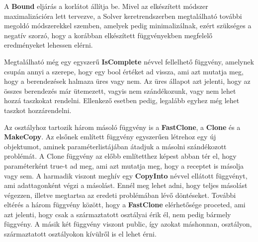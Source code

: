 A \textbf{Bound} eljárás a korlátot állítja be.
Mivel az elkészített módszer maximalizációra lett tervezve, a Solver keretrendszerben megtalálható további megoldó módszerekkel szemben, amelyek pedig minimalizálnak, ezért szükséges a negatív szorzó, hogy a korábban elkészített függvényekben megfelelő eredményeket lehessen elérni.

Megtalálható még egy egyszerű \textbf{IsComplete} névvel fellelhető függvény, amelynek csupán annyi a szerepe, hogy egy bool értéket ad vissza, ami azt mutatja meg, hogy a berendezések halmaza üres vagy nem.
Az üres állapot azt jelenti, hogy az összes berendezés már ütemezett, vagyis nem szándékozunk, vagy nem lehet hozzá taszkokat rendelni. Ellenkező esetben pedig, legalább egyhez még lehet taszkot hozzárendelni.

Az osztályhoz tartozik három másoló függvény is a \textbf{FastClone}, a \textbf{Clone} és a \textbf{MakeCopy}.
Az elsőnek említett függvény egyszerűen létrehoz egy új objektumot, aminek paraméterlistájában átadjuk a másolni szándékozott problémát.
A Clone függvény az előbb említetthez képest abban tér el, hogy paraméterként true-t ad meg, ami azt mutatja meg, hogy a receptet is másolja vagy sem.
A harmadik viszont meghív egy \textbf{CopyInto} névvel ellátott függvényt, ami adattagonként végzi a másolást.
Ennél meg lehet adni, hogy teljes másolást végezzen, illetve megtartsa az eredeti problémában lévő döntéseket.
További eltérés a három függvény között, hogy a \textbf{FastClone} elérhetősége proceted, ami azt jelenti, hogy csak a származtatott osztályai érik él, nem pedig bármely függvény.
A másik két függvény viszont public, így azokat máshonnan, osztályon, származtatott osztályokon kívülről is el lehet érni.

